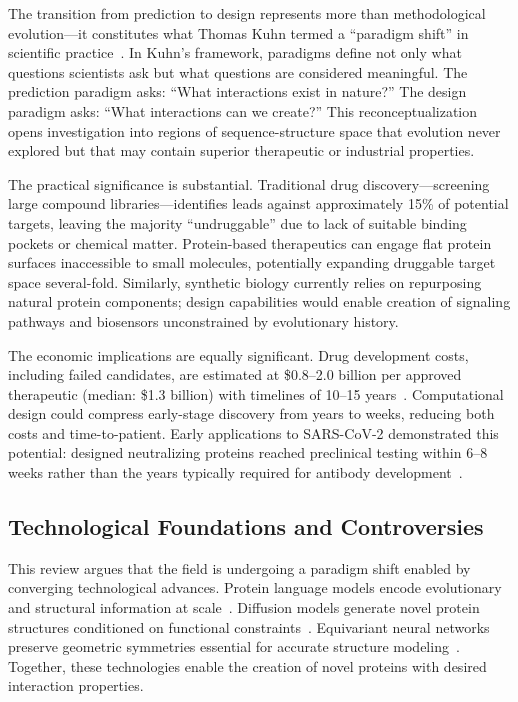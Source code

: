 The transition from prediction to design represents more than methodological evolution---it constitutes what Thomas Kuhn termed a ``paradigm shift'' in scientific practice~\cite{kuhn1962structure}. In Kuhn's framework, paradigms define not only what questions scientists ask but what questions are considered meaningful. The prediction paradigm asks: ``What interactions exist in nature?'' The design paradigm asks: ``What interactions can we create?'' This reconceptualization opens investigation into regions of sequence-structure space that evolution never explored but that may contain superior therapeutic or industrial properties.

The practical significance is substantial. Traditional drug discovery---screening large compound libraries---identifies leads against approximately 15\% of potential targets, leaving the majority ``undruggable'' due to lack of suitable binding pockets or chemical matter. Protein-based therapeutics can engage flat protein surfaces inaccessible to small molecules, potentially expanding druggable target space several-fold. Similarly, synthetic biology currently relies on repurposing natural protein components; design capabilities would enable creation of signaling pathways and biosensors unconstrained by evolutionary history.

The economic implications are equally significant. Drug development costs, including failed candidates, are estimated at \$0.8--2.0 billion per approved therapeutic (median: \$1.3 billion) with timelines of 10--15 years~\cite{wouters2020cost}. Computational design could compress early-stage discovery from years to weeks, reducing both costs and time-to-patient. Early applications to SARS-CoV-2 demonstrated this potential: designed neutralizing proteins reached preclinical testing within 6--8 weeks rather than the years typically required for antibody development~\cite{watson2023rfdiffusion}.

\subsection*{Technological Foundations and Controversies}

This review argues that the field is undergoing a paradigm shift enabled by converging technological advances. Protein language models encode evolutionary and structural information at scale~\cite{rives2021esm1b,lin2023esm2}. Diffusion models generate novel protein structures conditioned on functional constraints~\cite{watson2023rfdiffusion,ingraham2023chroma}. Equivariant neural networks preserve geometric symmetries essential for accurate structure modeling~\cite{jing2021gvp,fuchs2020se3transformer}. Together, these technologies enable the creation of novel proteins with desired interaction properties.

